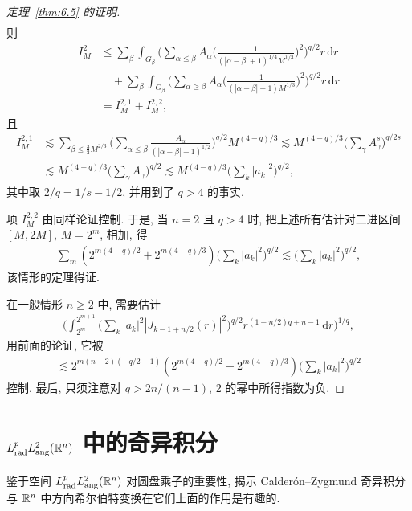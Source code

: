 \begin{proof}[定理~\ref{thm:6.5} 的证明]
\begin{align*}
\end{align*}
则
\begin{align*}
  I_{M}^{2}
  &\leq\sum_{\beta}\int_{G_{\beta}}\Big(\sum_{\alpha\leq\beta}
   A_{\alpha}\Big(\frac{1}{(|\alpha-\beta|+1)^{1/4}M^{1/3}}\Big)^{2}\Big)^{q/2}r\,\mathrm{d}r\\
  &\quad+\sum_{\beta}\int_{G_{\beta}}\Big(\sum_{\alpha\geq\beta}
   A_{\alpha}\Big(\frac{1}{(|\alpha-\beta|+1)M^{1/3}}\Big)^{2}\Big)^{q/2}r\,\mathrm{d}r\\
  &=I_{M}^{2,1}+I_{M}^{2,2},
\end{align*}
且
\begin{align*}
  I_{M}^{2,1}
  &\lesssim\sum_{\beta\leq\frac{3}{2}M^{2/3}}
   \Big(\sum_{\alpha\leq\beta}\frac{A_{\alpha}}{(|\alpha-\beta|+1)^{1/2}}\Big)^{q/2}M^{(4-q)/3}
  \lesssim M^{(4-q)/3}\Big(\sum_{\gamma}A_{\gamma}^{s}\Big)^{q/2s}\\
  &\lesssim M^{(4-q)/3}\Big(\sum_{\gamma}A_{\gamma}\Big)^{q/2}
  \lesssim M^{(4-q)/3}\Big(\sum_{k}|a_{k}|^{2}\Big)^{q/2},
\end{align*}
其中取 $2/q = 1/s - 1/2$, 并用到了 $q > 4$ 的事实.

项 $I_{M}^{2,2}$ 由同样论证控制. 于是, 当 $n = 2$ 且 $q > 4$ 时, 把上述所有估计对二进区间 $[M, 2M]$, $M = 2^{m}$, 相加, 得
\begin{align*}
  \sum_{m}\left(2^{m(4-q)/2}+2^{m(4-q)/3}\right)\Big(\sum_{k}|a_{k}|^{2}\Big)^{q/2}
  \lesssim\Big(\sum_{k}|a_{k}|^{2}\Big)^{q/2},
\end{align*}
该情形的定理得证.

在一般情形 $n \geq 2$ 中, 需要估计
\begin{align*}
  \Big(\int_{2^{m}}^{2^{m+1}}\Big(\sum_{k}|a_{k}|^{2}|J_{k-1+n/2}(r)|^{2}\Big)^{q/2}
  r^{(1-n/2)q+n-1}\,\mathrm{d}r\Big)^{1/q},
\end{align*}
用前面的论证, 它被
\begin{align*}
  \lesssim 2^{m(n-2)(-q/2+1)}\left(2^{m(4-q)/2}+2^{m(4-q)/3}\right)\Big(\sum_{k}|a_{k}|^{2}\Big)^{q/2}
\end{align*}
控制. 最后, 只须注意对 $q > 2n/(n - 1)$, 2 的幂中所得指数为负.
\end{proof}

\section{\texorpdfstring{$L^p_{\mathrm{rad}}L^2_{\mathrm{ang}}(\mathbb{R}^n)$ 中的奇异积分}{𝐿ᵖ_{𝑟𝑎𝑑}𝐿²_{𝑎𝑛𝑔}(ℝⁿ) 中的奇异积分}}

鉴于空间 $L_{\mathrm{rad}}^pL_{\mathrm{ang}}^2(\mathbb{R}^n)$ 对圆盘乘子的重要性, 揭示 Calderón--Zygmund 奇异积分与 $\mathbb{R}^n$ 中方向希尔伯特变换在它们上面的作用是有趣的.

